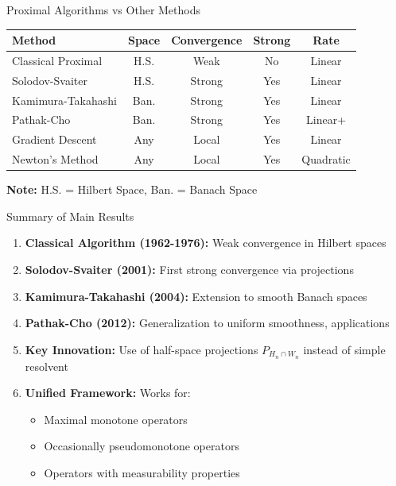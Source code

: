 \documentclass[aspectratio=169,10pt]{beamer}
\begin{document}
\begin{frame}{Proximal Algorithms vs Other Methods}
    \begin{table}
        \centering
        \begin{tabular}{|l|c|c|c|c|}
            \hline
            \textbf{Method} & \textbf{Space} & \textbf{Convergence} & \textbf{Strong} & \textbf{Rate} \\
            \hline
            Classical Proximal & H.S. & Weak & No & Linear \\
            \hline
            Solodov-Svaiter & H.S. & Strong & Yes & Linear \\
            \hline
            Kamimura-Takahashi & Ban. & Strong & Yes & Linear \\
            \hline
            Pathak-Cho & Ban. & Strong & Yes & Linear+ \\
            \hline
            Gradient Descent & Any & Local & Yes & Linear \\
            \hline
            Newton's Method & Any & Local & Yes & Quadratic \\
            \hline
        \end{tabular}
    \end{table}

    \vspace{0.3cm}
    \textbf{Note:} H.S. = Hilbert Space, Ban. = Banach Space
\end{frame}

\begin{frame}[allowframebreaks]{Summary of Main Results}
    \begin{enumerate}
        \item \textbf{Classical Algorithm (1962-1976):} Weak convergence in Hilbert spaces

        \item \textbf{Solodov-Svaiter (2001):} First strong convergence via projections

        \item \textbf{Kamimura-Takahashi (2004):} Extension to smooth Banach spaces

        \item \textbf{Pathak-Cho (2012):} Generalization to uniform smoothness, applications

        \item \textbf{Key Innovation:} Use of half-space projections $P_{H_n \cap W_n}$
              instead of simple resolvent

        \item \textbf{Unified Framework:} Works for:
        \begin{itemize}
            \item Maximal monotone operators
            \item Occasionally pseudomonotone operators
            \item Operators with measurability properties
        \end{itemize}
    \end{enumerate}
\end{frame}
\end{document}
